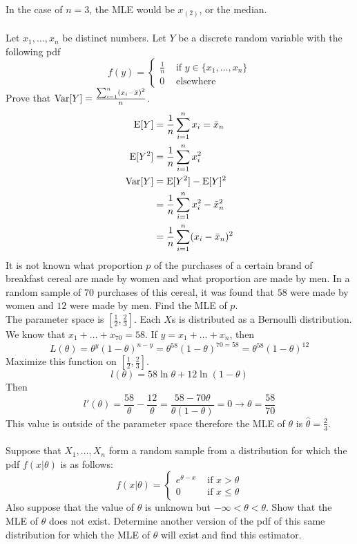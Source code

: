 \documentclass[12pt]{article}
\begin{document}
In the case of $n=3$, the MLE would be $x_{(2)}$, or the median. \\~\\
Let $x_1,\dots,x_n$ be distinct numbers. Let $Y$ be a discrete random variable with the following pdf $$ f(y) = \begin{cases} \frac{1}{n} &\text{ if } y \in \{x_1,\dots,x_n\} \\ 0 &\text{ elsewhere } \end{cases} $$ 
Prove that $\mathrm{Var}[ Y ] = \frac{\sum_{i=1}^n (x_i - \bar{x})^2}{n}$. 
$$\begin{aligned} \mathrm{E}[ Y ] &= \frac{1}{n} \sum_{i=1}^n x_i = \bar{x}_n \\ \mathrm{E}[ Y^2 ] &= \frac{1}{n} \sum_{i=1}^n x_i^2 \\ \mathrm{Var}[ Y ] &= \mathrm{E}[ Y^2 ] - \mathrm{E}[ Y ]^2 \\ &= \frac{1}{n} \sum_{i=1}^n x_i^2 - \bar{x}_n^2 \\ &= \frac{1}{n}\sum_{i=1}^n (x_i - \bar{x}_n)^2 \end{aligned} $$ 
It is not known what proportion $p$ of the purchases of a certain brand of breakfast cereal are made by women and what proportion are made by men. In a random sample of $70$ purchases of this cereal, it was found that $58$ were made by women and $12$ were made by men. Find the MLE of $p$. \\
The parameter space is $[\frac{1}{2}, \frac{2}{3}]$. Each $X$s is distributed as a Bernoulli distribution. We know that $x_1 + \dots + x_{70} = 58$. If $y = x_1 + \dots + x_n$, then $$L(\theta) = \theta^y(1-\theta)^{n-y} = \theta^{58}(1-\theta)^{70 = 58} = \theta^{58}(1-\theta)^{12} $$ Maximize this function on $[\frac{1}{2}, \frac{2}{3}]$. $$ l(\theta) = 58\ln\theta + 12\ln(1-\theta)$$ Then $$l'(\theta) = \frac{58}{\theta} - \frac{12}{\theta} = \frac{58 - 70\theta}{\theta(1-\theta)} = 0 \to \theta = \frac{58}{70} $$ This value is outside of the parameter space therefore the MLE of $\theta$ is $\hat{\theta} = \frac{2}{3}$. \\~\\
Suppose that $X_1,\dots,X_n$ form a random sample from a distribution for which the pdf $f(x|\theta)$ is as follows: $$f(x|\theta) = \begin{cases} e^{\theta-x} &\text{ if } x > \theta \\ 0 &\text{ if } x \leq \theta \end{cases} $$ 
Also suppose that the value of $\theta$ is unknown but $-\infty < \theta < \theta$. Show that the MLE of $\theta$ does not exist. Determine another version of the pdf of this same distribution for which the MLE of $\theta$ will exist and find this estimator. \\ 
\end{document}

